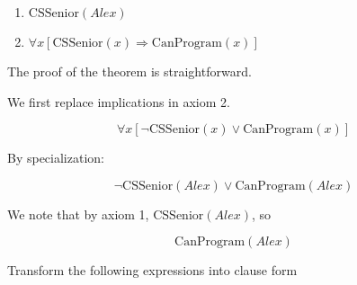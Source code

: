 \documentclass[11pt,largemargins, anonymous]{homework}
\begin{document}
\begin{enumerate}
    \item \( \mathrm{CSSenior}(Alex) \)
    \item \( \forall x [\mathrm{CSSenior}(x) \Rightarrow \mathrm{CanProgram}(x)] \)
\end{enumerate}

The proof of the theorem is straightforward.

We first replace implications in axiom 2.

\[ \forall x [\neg \mathrm{CSSenior}(x) \lor \mathrm{CanProgram}(x)] \]

By specialization:

\[ \neg \mathrm{CSSenior}(Alex) \lor \mathrm{CanProgram}(Alex) \]

We note that by axiom 1, \( \mathrm{CSSenior}(Alex) \), so

\[ \mathrm{CanProgram}(Alex) \]

\question

Transform the following expressions into clause form
\end{document}
